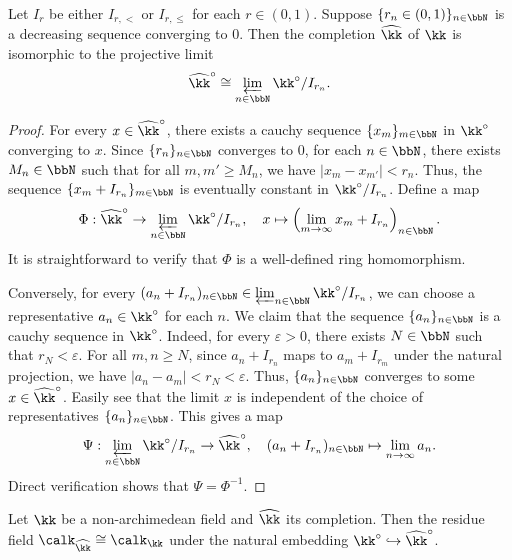     \begin{proposition}\label{prop:recover_complete_non-archimedean_fields_from_projective_limits}
        Let \(I_r\) be either \(I_{r,<}\) or \(I_{r,\leq}\) for each \(r \in (0,1)\).
        Suppose \(\{r_n \in (0,1)\}_{n \in \bbN }\) is a decreasing sequence converging to \(0\).
        Then the completion \(\widehat{\kk}\) of \(\kk\) is isomorphic to the projective limit
        \[ \widehat{\kk}^\circ \cong \varprojlim_{n \in \bbN} \kk^\circ / I_{r_n}. \]
    \end{proposition}
    \begin{proof}
        For every \(x \in \widehat{\kk}^\circ\), there exists a cauchy sequence \(\{x_m\}_{m \in \bbN}\) in \(\kk^\circ\) converging to \(x\).
        Since \(\{r_n\}_{n \in \bbN}\) converges to \(0\), for each \(n \in \bbN\), there exists \(M_n \in \bbN\) such that for all \(m, m' \geq M_n\), we have \(|x_m - x_{m'}| < r_n\).
        Thus, the sequence \(\{x_m + I_{r_n}\}_{m \in \bbN}\) is eventually constant in \(\kk^\circ / I_{r_n}\).
        Define a map
        \[
            \Phi : \widehat{\kk}^\circ \to \varprojlim_{n \in \bbN} \kk^\circ / I_{r_n}, \quad x \mapsto \left(\lim_{m\to \infty} x_m + I_{r_n}\right)_{n \in \bbN}.
        \]
        It is straightforward to verify that \(\Phi\) is a well-defined ring homomorphism.

        Conversely, for every \((a_n + I_{r_n})_{n \in \bbN} \in \varprojlim_{n \in \bbN} \kk^\circ / I_{r_n}\), we can choose a representative \(a_n \in \kk^\circ\) for each \(n\).
        We claim that the sequence \(\{a_n\}_{n \in \bbN}\) is a cauchy sequence in \(\kk^\circ\).
        Indeed, for every \(\varepsilon > 0\), there exists \(N \in \bbN\) such that \(r_N < \varepsilon\).
        For all \(m, n \geq N\), since \(a_n + I_{r_n}\) maps to \(a_m + I_{r_m}\) under the natural projection, we have \(|a_n - a_m| < r_N < \varepsilon\).
        Thus, \(\{a_n\}_{n \in \bbN}\) converges to some \(x \in \widehat{\kk}^\circ\).
        Easily see that the limit \(x\) is independent of the choice of representatives \(\{a_n\}_{n \in \bbN}\).
        This gives a map
        \[
            \Psi : \varprojlim_{n \in \bbN} \kk^\circ / I_{r_n} \to \widehat{\kk}^\circ, \quad (a_n + I_{r_n})_{n \in \bbN} \mapsto \lim_{n\to \infty} a_n.
        \]
        Direct verification shows that \(\Psi = \Phi^{-1}\).
    \end{proof}

    \begin{corollary}\label{prop:residue_field_of_completion_is_equal_to_the_original_fields}
        Let \(\kk\) be a non-archimedean field and \(\widehat{\kk}\) its completion.
        Then the residue field \(\calk_{\widehat{\kk}} \cong \calk_\kk\) under the natural embedding \(\kk^\circ \hookrightarrow \widehat{\kk}^\circ\).
    \end{corollary}

